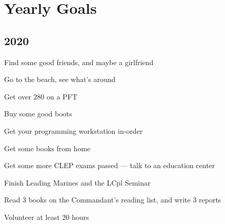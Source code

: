 \chapter{Yearly Goals}

\section{2020}

\begin{todolist}
\item Find some good friends, and maybe a girlfriend
\item Go to the beach, see what's around
\item Get over 280 on a PFT
\item Buy some good boots
\item Get your programming workstation in-order
\item Get some books from home
\item Get some more CLEP exams passed --- talk to an education center
\item Finish Leading Marines and the LCpl Seminar
\item Read 3 books on the Commandant's reading list, and write 3 reports
\item Volunteer at least 20 hours
\end{todolist}
